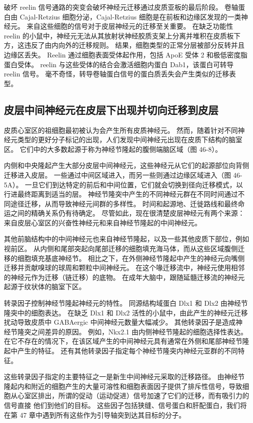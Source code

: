 破坏 reelin 信号通路的突变会破坏神经元迁移通过皮质亚板的最后阶段。 卷轴蛋白由 Cajal-Retzius 细胞分泌，Cajal-Retzius 细胞是在前板和边缘区发现的一类神经元。 来自这些细胞的信号对于皮层神经元的迁移至关重要。 在缺乏功能性 reelin 的小鼠中，神经元无法从其放射状神经胶质支架上分离并堆积在皮质板下方，这违反了由内向外的迁移规则。 结果，细胞类型的正常分层被部分反转并且边缘区丢失。 Reelin 通过细胞表面受体起作用，包括 ApoE 受体 2 和极低密度脂蛋白受体。 reelin 与这些受体的结合会激活细胞内蛋白 Dab1，该蛋白可转导 reelin 信号。 毫不奇怪，转导卷轴蛋白信号的蛋白质丢失会产生类似的迁移表型。

\subsection{皮层中间神经元在皮层下出现并切向迁移到皮层}
皮质心室区的祖细胞最初被认为会产生所有皮质神经元。 然而，随着针对不同神经元类型的更好分子标记的出现，人们发现中间神经元出现在皮质下结构的脑室区。 它们中的大多数起源于称为神经节隆起的腹侧端脑区域（图 46-8）。

内侧和中央隆起产生大部分皮层中间神经元，这些神经元从它们的起源部位向背侧迁移进入皮层。 一些通过中间区域进入，而另一些则通过边缘区域进入（图 46-5A）。 一旦它们到达特定的前后和中间位置，它们就会切换到径向迁移模式，以行进最终距离到适当的层。 神经节隆突中产生的不同神经元群在不同时间通过不同途径迁移，从而导致神经元间群的多样性。 时间和起源地、迁徙路线和最终命运之间的精确关系仍有待确定。 尽管如此，现在很清楚皮层神经元有两个来源：来自皮层心室区的兴奋性神经元和来自神经节隆起的中间神经元。

其他前脑结构中的中间神经元也来自神经节隆起，以及一些其他皮质下部位，例如视前区。 从内侧和尾部突起向尾部迁移的细胞填充海马体，而从这些区域腹侧迁移的细胞填充基底神经节。 相比之下，在外侧神经节隆起中产生的神经元向嘴侧迁移并贡献嗅球的球周和颗粒中间神经元。 在这个喙迁移流中，神经元使用相邻的神经元作为迁移（链迁移）的底物。 在成年大脑中，跟随延髓迁移流的神经元起源于纹状体的脑室下区。

转录因子控制神经节隆起神经元的特性。 同源结构域蛋白 Dlx1 和 Dlx2 由神经节隆突中的细胞表达。 在缺乏 Dlx1 和 Dlx2 活性的小鼠中，由此产生的神经元迁移扰动导致皮质中 GABAergic 中间神经元数量大幅减少。 其他转录因子是造成神经节隆突之间差异的原因。 例如，Nkx2.1 由内侧神经节隆起的细胞选择性表达。 在它不存在的情况下，在该区域产生的中间神经元具有通常在外侧和尾部神经节隆起中产生的特征。 还有其他转录因子指定每个神经节隆突内神经元亚群的不同特征。

这些转录因子指定的主要特征之一是新生中间神经元采取的迁移路径。 由神经节隆起内和附近的细胞产生的大量可溶性和细胞表面因子提供了排斥性信号，导致细胞从心室区排出，所谓的促动（运动促进）信号加速了它们的迁移，而有吸引力的信号直接 他们到他们的目标。 这些因子包括狭缝、信号蛋白和肝配蛋白，我们将在第 47 章中遇到所有这些作为引导轴突到达其目标的分子。

